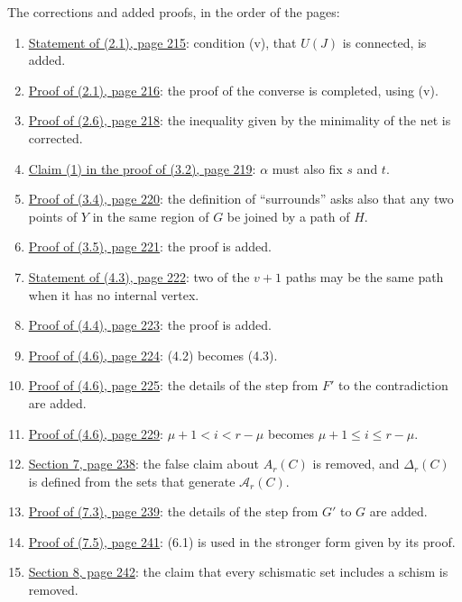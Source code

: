 The corrections and added proofs, in the order of the pages:
\begin{enumerate}\setlength{\itemsep}{1pt}
\item {}\hyperref[fix:2.1]{Statement of (2.1), page 215}: condition (v), that $U(J)$ is connected,
is added.
\item {}\hyperref[fix:2.1-proof]{Proof of (2.1), page 216}: the proof of the converse is
completed, using (v).
\item {}\hyperref[fix:2.6-proof]{Proof of (2.6), page 218}: the inequality given by the
minimality of the net is corrected.
\item {}\hyperref[fix:3.2-claim1]{Claim (1) in the proof of (3.2), page 219}: $\alpha$ must also
fix $s$ and $t$.
\item {}\hyperref[fix:3.4-surrounds]{Proof of (3.4), page 220}: the definition of ``surrounds''
asks also that any two points of $Y$ in the same region of $G$ be joined by a path of $H$.
\item {}\hyperref[fix:3.5-proof-added]{Proof of (3.5), page 221}: the proof is added.
\item {}\hyperref[fix:4.3]{Statement of (4.3), page 222}: two of the $v+1$ paths may be the same
path when it has no internal vertex.
\item {}\hyperref[fix:4.4-proof-added]{Proof of (4.4), page 223}: the proof is added.
\item {}\hyperref[fix:4.6-p224]{Proof of (4.6), page 224}: (4.2) becomes (4.3).
\item {}\hyperref[fix:4.6-p225-added]{Proof of (4.6), page 225}: the details of the step from $F'$ to the contradiction are added.
\item {}\hyperref[fix:4.6-p229]{Proof of (4.6), page 229}: $\mu+1<i<r-\mu$ becomes
$\mu+1\le i\le r-\mu$.
\item {}\hyperref[fix:7-Delta]{Section 7, page 238}: the false claim about $A_r(C)$ is removed,
and $\Delta_r(C)$ is defined from the sets that generate $\mathcal{A}_r(C)$.
\item {}\hyperref[fix:7.3-proof-added]{Proof of (7.3), page 239}: the details of the step from $G'$ to $G$ are added.
\item {}\hyperref[fix:7.5-proof]{Proof of (7.5), page 241}: (6.1) is used in the stronger form
given by its proof.
\item {}\hyperref[fix:8-schism]{Section 8, page 242}: the claim that every schismatic set includes
a schism is removed.
\end{enumerate}
